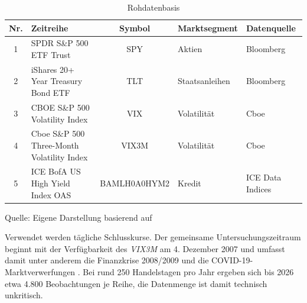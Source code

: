\begin{table}[!htb]
    \setlength{\arrayrulewidth}{1pt}
    \renewcommand{\arraystretch}{1.25}
    \begin{threeparttable}
        \caption{Rohdatenbasis}
        \label{tab:rohdatenbasis}

        \small

        \begin{tabularx}{\textwidth}{
            |c|
            >{\raggedright\arraybackslash}X|
            c|
            >{\raggedright\arraybackslash}p{2.4cm}|
            >{\raggedright\arraybackslash}p{2.5cm}|
        }
            \hline
            \textbf{Nr.} &
            \textbf{Zeitreihe} &
            \textbf{Symbol} &
            \textbf{Marktsegment} &
            \textbf{Datenquelle}
            \tabularnewline \hline

            1 &
            SPDR S\&P 500 ETF Trust &
            SPY &
            Aktien &
            Bloomberg
            \tabularnewline \hline

            2 &
            iShares 20+ Year Treasury Bond ETF &
            TLT &
            Staatsanleihen &
            Bloomberg
            \tabularnewline \hline

            3 &
            CBOE S\&P 500 Volatility Index &
            VIX &
            Volatilität &
            Cboe
            \tabularnewline \hline

            4 &
            Cboe S\&P 500 Three-Month Volatility Index &
            VIX3M &
            Volatilität &
            Cboe
            \tabularnewline \hline

            5 &
            ICE BofA US High Yield Index OAS &
            BAMLH0A0HYM2 &
            Kredit &
            ICE Data Indices
            \tabularnewline \hline
        \end{tabularx}
        \begin{tablenotes}[flushleft]
            \item \normalsize{Quelle: Eigene Darstellung basierend auf \cite{noauthor_spy:_nodate, noauthor_ishares_nodate, noauthor_vix_nodate, noauthor_cboe_nodate, ice_bofa}}
        \end{tablenotes}
    \end{threeparttable}
\end{table}

Verwendet werden tägliche Schlusskurse. Der gemeinsame Untersuchungszeitraum beginnt mit der Verfügbarkeit des \textit{VIX3M} am 4. Dezember 2007 und umfasst damit unter anderem die Finanzkrise 2008/2009 und die COVID-19-Marktverwerfungen \cite{chicacgo_vix3m}. Bei rund 250 Handelstagen pro Jahr ergeben sich bis 2026 etwa 4.800 Beobachtungen je Reihe, die Datenmenge ist damit technisch unkritisch.

